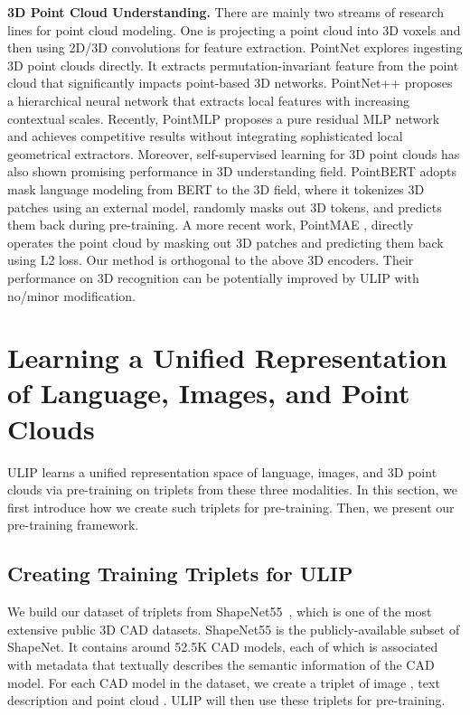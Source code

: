\documentclass[10pt,twocolumn,letterpaper]{article}
\begin{document}
\noindent\textbf{3D Point Cloud Understanding.}
There are mainly two streams of research lines for point cloud modeling. One is projecting a point cloud into 3D voxels \cite{maturana2015voxnet,shi2020pv} and then using 2D/3D convolutions for feature extraction. PointNet \cite{qi2017pointnet} explores ingesting 3D point clouds directly. It extracts permutation-invariant feature from the point cloud that significantly impacts point-based 3D networks. PointNet++ \cite{qi2017pointnet++} proposes a hierarchical neural network that extracts local features with increasing contextual scales. Recently, PointMLP \cite{ma2022rethinking} proposes a pure residual MLP network and achieves competitive results without integrating sophisticated local geometrical extractors. 
Moreover, self-supervised learning for 3D point clouds has also shown promising performance in 3D understanding field. PointBERT \cite{yu2022point} adopts mask language modeling from BERT \cite{devlin2018bert} to the 3D field, where it tokenizes 3D patches using an external model, randomly masks out 3D tokens, and predicts them back during pre-training. A more recent work, PointMAE \cite{pang2022masked}, directly operates the point cloud by masking out 3D patches and predicting them back using L2 loss. Our method is orthogonal to the above 3D encoders. Their performance on 3D recognition can be potentially improved by ULIP with no/minor modification.

\section{Learning a Unified Representation of Language,
Images, and Point Clouds}
\label{sec:method}


ULIP learns a unified representation space of language, images, and 3D point clouds via pre-training on triplets from these three modalities. 
In this section, we first introduce how we create such triplets for pre-training. Then, we present our pre-training framework.

\subsection{Creating Training Triplets for ULIP}
\label{sec:create triplet}


We build our dataset of triplets from ShapeNet55~\cite{chang2015shapenet}, which is one of the most extensive public 3D CAD datasets. 
ShapeNet55 is the publicly-available subset of ShapeNet. 
It contains around 52.5K CAD models, each of which is associated with metadata that textually describes the semantic information of the CAD model. 
For each CAD model  in the dataset, we create a triplet  of image , text description  and point cloud . ULIP will then use these triplets for pre-training. 
\end{document}
